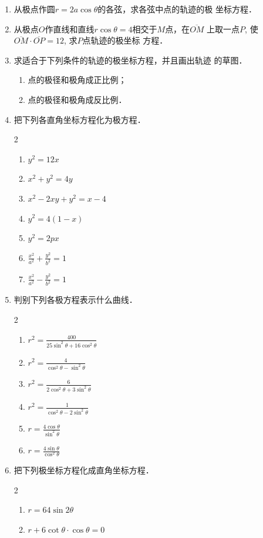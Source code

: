 \begin{enumerate}
    \item 从极点作圆$r=2a\cos\theta$的各弦，求各弦中点的轨迹的极
    坐标方程．
    \item 从极点$O$作直线和直线$r\cos\theta=4$相交于$M$点，在$\overline{OM}$
    上取一点$P$, 使$\overline{OM}\cdot\overline{OP}=12$, 求$P$点轨迹的极坐标
    方程．
    \item 求适合于下列条件的轨迹的极坐标方程，并且画出轨迹
    的草图．
\begin{enumerate}
    \item 点的极径和极角成正比例；
    \item 点的极径和极角成反比例．
\end{enumerate}
\item 把下列各直角坐标方程化为极方程．
\begin{multicols}{2}
\begin{enumerate}
    \item $y^2=12x$
    \item $x^2+y^2=4y$
    \item $x^2-2xy+y^2=x-4$
    \item $y^2=4(1-x)$
    \item $y^2=2px$
    \item $\frac{x^2}{a^2}+\frac{y^2}{b^2}=1$
    \item $\frac{x^2}{a^2}-\frac{y^2}{b^2}=1$
\end{enumerate}
\end{multicols}
\item 判别下列各极方程表示什么曲线．
\begin{multicols}{2}
    \begin{enumerate}
    \item $r^2=\frac{400}{25\sin^2\theta+16\cos^2\theta}$
    \item $r^2=\frac{4}{\cos^2\theta-\sin^2\theta}$
    \item $r^2=\frac{6}{2\cos^2\theta+3\sin^2\theta}$
    \item $r^2=\frac{1}{\cos^2\theta-2\sin^2\theta}$
    \item $r=\frac{4\cos\theta}{\sin^2\theta}$
    \item $r=\frac{4\sin\theta}{\cos^2\theta}$
\end{enumerate}
\end{multicols}

\item 把下列极坐标方程化成直角坐标方程．
\begin{multicols}{2}
\begin{enumerate}
    \item $r=64\sin2\theta$
    \item $r+6\cot\theta\cdot \cos\theta=0$
\end{enumerate}
\end{multicols}

\end{enumerate}


